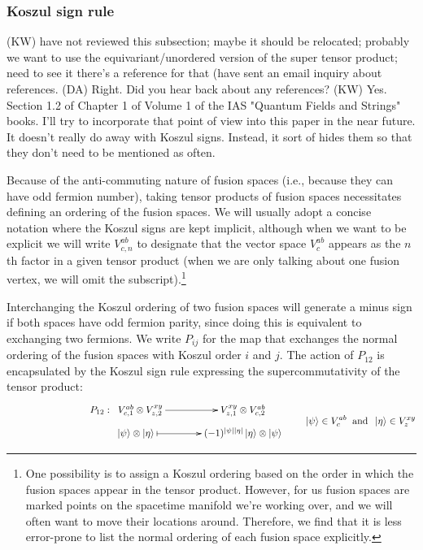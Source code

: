 \documentclass[12pt,a4paper]{article}
\newcommand{\tp}{\otimes}
\newcommand{\kw}[1]{{\color{kwcolor}\footnotesize{(KW) #1}}}
\newcommand{\ket}[1]{\ensuremath{\left|#1\right\rangle}}
\newcommand{\dave}[1]{{\color{ao(english)}\footnotesize{(DA) #1}}}
\begin{document}
\subsubsection{Koszul sign rule} \label{koszul_signs}

\kw{have not reviewed this subsection; maybe it should be relocated; 
probably we want to use the equivariant/unordered version of the super tensor product; 
need to see it there's a reference for that (have sent an email inquiry about references.}
\dave{Right. Did you hear back about any references?}
\kw{Yes.  Section 1.2 of Chapter 1 of Volume 1 of the IAS "Quantum Fields and Strings" books.
I'll try to incorporate that point of view into this paper in the near future.
It doesn't really do away with Koszul signs.
Instead, it sort of hides them so that they don't need to be mentioned as often.}

Because of the anti-commuting nature of fusion spaces (i.e., because they can have odd fermion number), taking tensor products of fusion spaces necessitates defining an ordering 
of the fusion spaces. 
We will usually adopt a concise notation where the Koszul signs are kept implicit, 
although when we want to be explicit we will write $V^{ab}_{c,n}$ to designate that the vector space $V^{ab}_c$ appears as the $n$th factor in a given tensor product (when we are only talking about one fusion vertex, we will omit the subscript).\footnote{One 
possibility is to assign a Koszul ordering based on the order in which the fusion spaces appear in the tensor product. 
However, for us fusion spaces are marked points on the spacetime manifold we're working over, and we will often want to move their locations around. 
Therefore, we find that it is less error-prone to list the normal ordering of each fusion space explicitly.}

Interchanging the Koszul ordering of two fusion spaces will generate a minus sign if both spaces have odd fermion parity, since doing this is equivalent to exchanging two fermions. 
We write $P_{ij}$ for the map that exchanges the normal ordering of the fusion spaces with Koszul order $i$ and $j$. 
The action of $P_{12}$ is encapsulated by the Koszul sign rule expressing the supercommutativity of the tensor product:
\begin{align}
\vcenter{\xymatrix @!0 @M=1mm @C=42mm{
 &P_{12}: \; \;V^{ab}_{c,1} \tp V^{xy}_{z,2} \ar[r]            &  V^{xy}_{z,1} \tp V^{ab}_{c,2} \\
		  &\;\;\;\;\;\;\; \ket{\psi}\tp\ket{\eta}  \ar@{|->}[r] & (-1)^{|\psi| |\eta|} \ket{\eta} \tp \ket{\psi}
	}} \quad \quad \ket{\psi} \in V^{ab}_{c} \;\; \text{and} \;\;  \ket{\eta} \in V^{xy}_{z}
\end{align}
\end{document}
